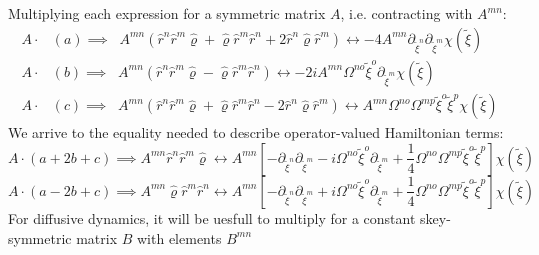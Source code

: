 \documentclass[%
reprint,
superscriptaddress,
nofootinbib,
 amsmath,amssymb,
prx,
floatfix,
]{revtex4-2}
\begin{document}
Multiplying each expression for a symmetric matrix $A$, i.e. contracting with  $A^{mn}$:
\begin{align}
\label{eq:sim_phase_master}
     A \cdot &(a) \implies \;\; A^{mn} \left( \hat{r}^n  \hat{r}^m  \hat{\varrho} + \hat{\varrho} \hat{r}^m  \hat{r}^n + 2 \hat{r}^n  \hat{\varrho}  \hat{r}^m \right) \longleftrightarrow   - 4 A^{mn} \partial_{\tilde{\xi}^n} \partial_{\tilde{\xi}^m} \chi (\tilde{\xi}) \nonumber \\ 
      A \cdot &(b) \implies \;\;  A^{mn} \left( \hat{r}^n  \hat{r}^m  \hat{\varrho} - \hat{\varrho} \hat{r}^m  \hat{r}^n  \right) \longleftrightarrow   - 2 i  A^{mn} \Omega^{n o} \tilde{\xi}^o  \partial_{\tilde{\xi}^m} \chi (\tilde{\xi})  \nonumber\\
       A \cdot &(c) \implies \;\;  A^{mn} \left( \hat{r}^n  \hat{r}^m  \hat{\varrho} + \hat{\varrho} \hat{r}^m  \hat{r}^n - 2 \hat{r}^n  \hat{\varrho}  \hat{r}^m   \right)  \longleftrightarrow A^{mn} \Omega^{n o} \Omega^{m p} \tilde{\xi}^o \tilde{\xi}^p \chi (\tilde{\xi}) 
\end{align}
We arrive to the equality needed to describe operator-valued Hamiltonian terms:
\begin{equation}
\label{eq:map_chara_second_1}
    A \cdot (a + 2 b + c) \implies A^{mn} \hat{r}^n  \hat{r}^m  \hat{\varrho} \leftrightarrow   A^{mn} \left[ -\partial_{\tilde{\xi}^n}\partial_{\tilde{\xi}^m}   -  i   \Omega^{n o} \tilde{\xi}^o  \partial_{\tilde{\xi}^m}  + \frac{1}{4} \Omega^{n o} \Omega^{m p} \tilde{\xi}^o \tilde{\xi}^p  \right] \chi (\tilde{\xi}) 
\end{equation}
\begin{equation}
\label{eq:map_chara_second_2}
    A \cdot (a - 2 b + c) \implies A^{mn}  \hat{\varrho} \hat{r}^m  \hat{r}^n   \leftrightarrow   A^{mn} \left[ -\partial_{\tilde{\xi}^n}\partial_{\tilde{\xi}^m}   +  i   \Omega^{n o} \tilde{\xi}^o  \partial_{\tilde{\xi}^m}  + \frac{1}{4} \Omega^{n o} \Omega^{m p} \tilde{\xi}^o \tilde{\xi}^p  \right] \chi (\tilde{\xi}) 
\end{equation}
For diffusive dynamics, it will be uesfull to multiply for a constant skey-symmetric matrix $B$ with elements $B^{mn}$ 
\end{document}
